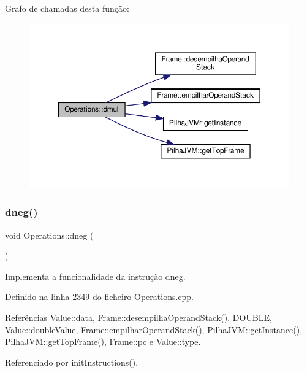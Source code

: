 Grafo de chamadas desta função\+:
\nopagebreak
\begin{figure}[H]
\begin{center}
\leavevmode
\includegraphics[width=350pt]{classOperations_afe1944066f35f66d588d1a28124ebb55_cgraph}
\end{center}
\end{figure}
\mbox{\label{classOperations_a04f5d4f85b80f4c04216cd0259d3d7dc}} 
\subsubsection{\texorpdfstring{dneg()}{dneg()}}
{\footnotesize\ttfamily void Operations\+::dneg (\begin{DoxyParamCaption}{ }\end{DoxyParamCaption})\hspace{0.3cm}{\ttfamily [private]}}



Implementa a funcionalidade da instrução dneg. 



Definido na linha 2349 do ficheiro Operations.\+cpp.



Referências Value\+::data, Frame\+::desempilha\+Operand\+Stack(), D\+O\+U\+B\+LE, Value\+::double\+Value, Frame\+::empilhar\+Operand\+Stack(), Pilha\+J\+V\+M\+::get\+Instance(), Pilha\+J\+V\+M\+::get\+Top\+Frame(), Frame\+::pc e Value\+::type.



Referenciado por init\+Instructions().

